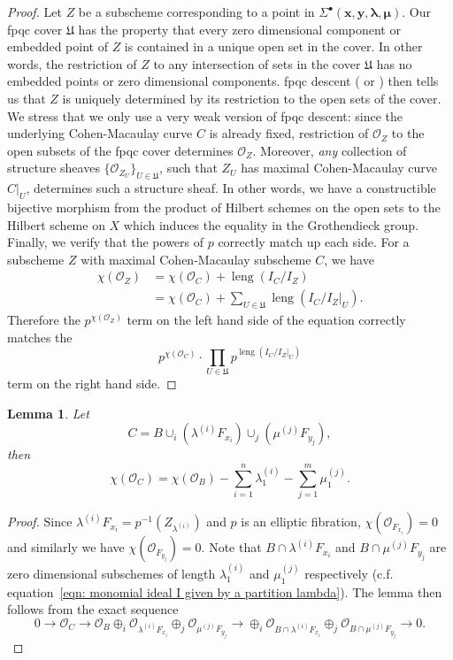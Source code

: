 \documentclass[12pt]{amsart}
\newtheorem{lemma}[theorem]{Lemma}
\theoremstyle{definition}
\renewcommand{\O}{\mathcal{O}}
\newcommand{\boldx}{\boldsymbol{x}}
\newcommand{\boldy}{\boldsymbol{y}}
\newcommand{\boldlambda}{\boldsymbol{\lambda }}
\newcommand{\boldmu}{\boldsymbol{\mu }}
\newcommand{\Sigmaxylambdamu}{\Sigma^{\bullet }(\boldx ,\boldy ,\boldlambda ,\boldmu )}
\newcommand{\length}{\operatorname{leng}}
\begin{document}
\begin{proof}
Let $Z$ be a subscheme corresponding to a point in
$\Sigmaxylambdamu$. Our fpqc cover $\mathfrak{U}$ has the property
that every zero dimensional component or embedded point of $Z$ is
contained in a unique open set in the cover. In other words, the
restriction of $Z$ to any intersection of sets in the cover
$\mathfrak{U}$ has no embedded points or zero dimensional
components. fpqc descent (\cite[Tag 023R,
Prop.~34.5.2]{stacks-project} or \cite[Thm.~4.23]{Vis}) then tells us
that $Z$ is uniquely determined by its restriction to the open sets of
the cover. We stress that we only use a very weak version of fpqc
descent: since the underlying Cohen-Macaulay curve $C$ is already
fixed, restriction of $\O_Z$ to the open subsets of the fpqc cover
determines $\O_Z$. Moreover, \emph{any} collection of structure
sheaves $\{\O_{Z_U}\}_{U \in \mathfrak{U}}$, such that $Z_U$ has
maximal Cohen-Macaulay curve $C|_U$, determines such a structure
sheaf.  In other words, we have a constructible bijective morphism
from the product of Hilbert schemes on the open sets to the Hilbert
scheme on $X$ which induces the equality in the Grothendieck
group. Finally, we verify that the powers of $p$ correctly match up
each side. For a subscheme $Z$ with maximal Cohen-Macaulay subscheme
$C$, we have
\begin{align*}
\chi (\O_{Z})&=\chi (\O_{C}) +\length (I_{C}/I_{Z})\\
&=\chi (\O_{C}) +\sum_{U\in \mathfrak{U}}\length (I_{C}/I_{Z}|_{U}).
\end{align*}
Therefore the $p^{\chi (\O_{Z})}$ term on the left hand side of the
equation correctly matches the 
\[
p^{\chi (\O_{C})}\cdot \prod_{U\in
\mathfrak{U}}p^{\length (I_{C}/I_{Z}|_{U})}
\]
term on
the right hand side.
\end{proof}

\begin{lemma}\label{lem: chi(C)=chi(B) -sum lamba1 - sum mu1}
Let 
\[
C=B\cup_{i}\left(\lambda^{(i)}F_{x_{i}} \right)\cup_{j}\left(\mu^{(j)}F_{y_{j}} \right),
\]
then
\[
\chi (\O_{C}) = \chi (\O_{B}) -\sum_{i=1}^{n}\lambda^{(i)}_{1}
-\sum_{j=1}^{m}\mu^{(j)}_{1}. 
\]
\end{lemma}
\begin{proof}
Since $\lambda^{(i)}F_{x_{i}}=p^{-1}(Z_{\lambda^{(i)}})$ and $p$ is an
elliptic fibration, $\chi (\O_{F_{x_{i}}})=0$ and similarly we have
$\chi (\O_{F_{y_{j}}})=0$. Note that $B\cap \lambda^{(i)}F_{x_{i}}$
and $B\cap \mu^{(j)}F_{y_{j}}$ are zero dimensional subschemes of
length $\lambda^{(i)}_{1}$ and $\mu^{(j)}_{1} $ respectively
(c.f. equation~\eqref{eqn: monomial ideal I given by a partition
lambda}). The lemma then follows from the exact sequence
\[
0\to \O_{C} \to
\O_{B}\oplus_{i}\O_{\lambda^{(i)}F_{x_{i}}}\oplus_{j}\O_{\mu^{(j)}F_{y_{j}}}
\to \oplus_{i}\O_{B\cap \lambda^{(i)}F_{x_{i}}}\oplus_{j}\O_{B\cap \mu^{(j)}F_{y_{j}}}  \to 0.
\]
\end{proof}
\end{document}
